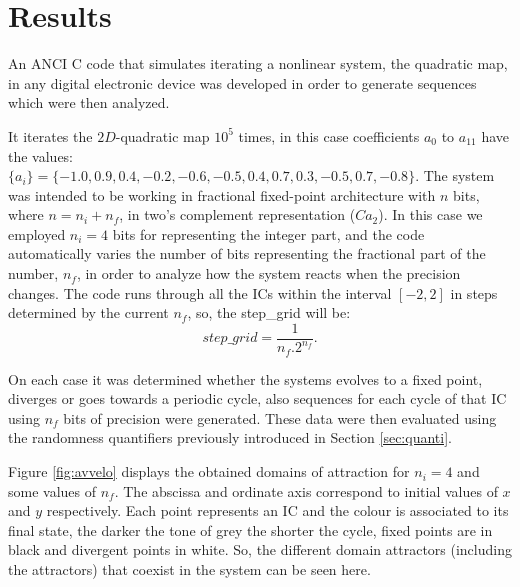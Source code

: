 \section{Results} \label{sec:results}
An ANCI C code that simulates iterating a nonlinear system, the quadratic map, in any  digital electronic device was developed in order to generate sequences which were then analyzed.

It iterates the $2D$-quadratic map $10^5$ times, in this case coefficients $a_0$ to $a_{11}$ have the values:\\
$\{a_i\}=\{-1.0, 0.9, 0.4, -0.2, -0.6, -0.5, 0.4, 0.7, 0.3, -0.5, 0.7,-0.8\}$. The system was intended to be working in fractional fixed-point
architecture with $n$ bits, where $n=n_i+n_f$, in two's complement representation ($Ca_2$). In this case we employed $n_i=4$ bits for representing the integer part, and the code automatically varies the number of bits representing the fractional part of the number, $n_f$, in order to analyze how the system reacts when the precision changes. The code runs through all the ICs within the interval $[-2,2]$ in steps determined by the current $n_f$, so, the step\_grid will be:
\begin{equation}
step\_grid=\frac{1}{n_f.2^{n_f}}.
\end{equation}

On each case it was determined whether the
systems evolves to a fixed point, diverges or goes towards a
periodic cycle, also sequences for each cycle of that IC using $n_f$ bits of precision were generated. These data were then evaluated using the randomness quantifiers previously introduced in Section \ref{sec:quanti}. 

Figure \ref{fig:avvelo} displays the obtained domains of attraction for $n_i=4$ and some values of $n_f$. The abscissa and ordinate axis correspond to initial values of $x$ and $y$ respectively. Each point represents an IC and the colour is associated to its final state,  the darker the tone of grey the shorter the cycle, fixed points are in black and divergent points in white. So, the different domain attractors (including the attractors) that coexist in the system can be seen here.



